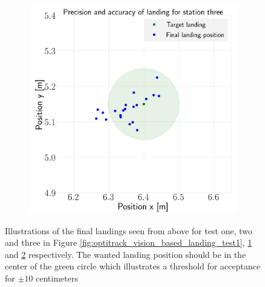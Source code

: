 \documentclass[../Head/report.tex]{subfiles}
\begin{document}
\begin{figure}[H]
\begin{subfigure}[t]{.30\textwidth}
        \caption{}
        \label{fig:optitrack_vision_based_landing_test2}
    \end{subfigure}
     \hspace{0.2em}
    \begin{subfigure}[t]{.30\textwidth}
        \centering
        \includegraphics[width=\textwidth]{../Figures/optitrack/landing_test/landing_for_station_three.png}
        \caption{}
        \label{fig:optitrack_vision_based_landing_test3}
    \end{subfigure}
    \caption{Illustrations of the final landings seen from above for test one, two and three in Figure \ref{fig:optitrack_vision_based_landing_test1}, \ref{fig:optitrack_vision_based_landing_test2} and \ref{fig:optitrack_vision_based_landing_test3} respectively. The wanted landing position should be in the center of the green circle which illustrates a threshold for acceptance for $\pm 10$ centimeters}
    \label{fig:optitrack_vision_based_landing_test}
\end{figure}
\end{document}
